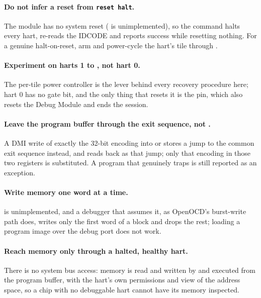 \paragraph{Do not infer a reset from \texttt{reset halt}.} The module has no system reset ( is unimplemented), so the command halts every hart, re-reads the IDCODE and reports success while resetting nothing. For a genuine halt-on-reset, arm  and power-cycle the hart's tile through .

\paragraph{Experiment on harts 1 to \MaxHartIndex{}, not hart 0.} The per-tile power controller is the lever behind every recovery procedure here; hart 0 has no gate bit, and the only thing that resets it is the  pin, which also resets the Debug Module and ends the session.

\paragraph{Leave the program buffer through the exit sequence, not .} A DMI write of exactly the 32-bit  encoding into  or  stores a jump to the common exit sequence instead, and reads back as that jump; only that encoding in those two registers is substituted. A program that genuinely traps is still reported as an exception.

\paragraph{Write memory one word at a time.}  is unimplemented, and a debugger that assumes it, as OpenOCD's burst-write path does, writes only the first word of a block and drops the rest; loading a program image over the debug port does not work.

\paragraph{Reach memory only through a halted, healthy hart.} There is no system bus access: memory is read and written by  and  executed from the program buffer, with the hart's own permissions and view of the address space, so a chip with no debuggable hart cannot have its memory inspected.

